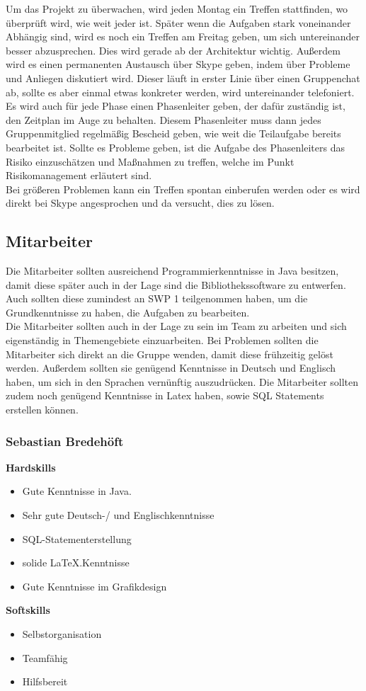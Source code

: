 \documentclass[fontsize=12pt,paper=a4,twoside]{scrartcl}
\begin{document}
Um das Projekt zu überwachen, wird jeden Montag ein Treffen stattfinden, wo überprüft wird, wie weit jeder ist. Später wenn die Aufgaben stark voneinander Abhängig sind, wird es noch ein Treffen am Freitag geben, um sich untereinander besser abzusprechen. Dies wird gerade ab der Architektur wichtig. Außerdem wird es einen permanenten Austausch über Skype geben, indem über Probleme und Anliegen diskutiert wird. Dieser läuft in erster Linie über einen Gruppenchat ab, sollte es aber einmal etwas konkreter werden, wird untereinander telefoniert. \\
Es wird auch für jede Phase einen Phasenleiter geben, der dafür zuständig ist, den Zeitplan im Auge zu behalten. Diesem Phasenleiter muss dann jedes Gruppenmitglied regelmäßig Bescheid geben, wie weit die Teilaufgabe bereits bearbeitet ist. Sollte es Probleme geben, ist die Aufgabe des Phasenleiters das Risiko einzuschätzen und Maßnahmen zu treffen, welche im Punkt Risikomanagement erläutert sind.\\
Bei größeren Problemen kann ein Treffen spontan einberufen werden oder es wird direkt bei Skype angesprochen und da versucht, dies zu lösen.

\subsection{Mitarbeiter}

Die Mitarbeiter sollten ausreichend Programmierkenntnisse in Java besitzen, damit diese später auch in der Lage sind die Bibliothekssoftware zu entwerfen. Auch sollten diese zumindest an SWP 1 teilgenommen haben, um die Grundkenntnisse zu haben, die Aufgaben zu bearbeiten. \\
Die Mitarbeiter sollten auch in der Lage zu sein im Team zu arbeiten und sich eigenständig in Themengebiete einzuarbeiten. Bei Problemen sollten die Mitarbeiter sich direkt an die Gruppe wenden, damit diese frühzeitig gelöst werden. Außerdem sollten sie genügend Kenntnisse in Deutsch und Englisch haben, um sich in den Sprachen vernünftig auszudrücken. Die Mitarbeiter sollten zudem noch genügend Kenntnisse in Latex haben, sowie SQL Statements erstellen können. 

\subsubsection{Sebastian Bredehöft}

\textbf{Hardskills}
\begin{itemize}
\item{Gute Kenntnisse in Java.}
\item{Sehr gute Deutsch-/ und Englischkenntnisse}
\item{SQL-Statementerstellung}
\item{solide \LaTeX.Kenntnisse}
\item{Gute Kenntnisse im Grafikdesign}
\end{itemize}
\textbf{Softskills}
\begin{itemize}
\item{Selbstorganisation}
\item{Teamfähig}
\item{Hilfsbereit}
\end{itemize}
\end{document}
